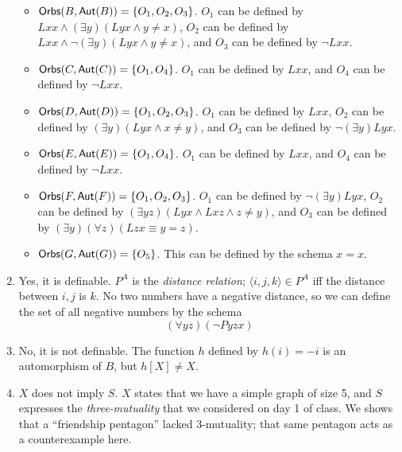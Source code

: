 \begin{mdframed}[linewidth=1]
\begin{enumerate}
\begin{itemize}
        \item $\mbox{$\mathsf{Orbs}(B,\mbox{$\mathsf{Aut}(B)$})$} = \{O_1, O_2, O_3\}$. $O_1$ can be defined by $Lxx \land (\exists y)(Lyx \land y \neq x)$, $O_2$ can be defined by $Lxx \land \lnot (\exists y)(Lyx \land y \neq x)$, and $O_3$ can be defined by $\lnot Lxx$. 

        \item $\mbox{$\mathsf{Orbs}(C,\mbox{$\mathsf{Aut}(C)$})$} = \{O_1, O_4\}$. $O_1$ can be defined by $Lxx$, and $O_4$ can be defined by $\lnot Lxx$. 

        \item $\mbox{$\mathsf{Orbs}(D,\mbox{$\mathsf{Aut}(D)$})$} = \{O_1, O_2, O_3\}$. $O_1$ can be defined by $Lxx$, $O_2$ can be defined by $(\exists y)(Lyx \land x \neq y)$, and $O_3$ can be defined by $\lnot (\exists y)Lyx$. 

        \item $\mbox{$\mathsf{Orbs}(E,\mbox{$\mathsf{Aut}(E)$})$} = \{O_1, O_4\}$. $O_1$ can be defined by $Lxx$, and $O_4$ can be defined by $\lnot Lxx$. 

        \item $\mbox{$\mathsf{Orbs}(F,\mbox{$\mathsf{Aut}(F)$})$} = \{O_1, O_2, O_3\}$. $O_1$ can be defined by $\lnot (\exists y)Lyx$, $O_2$ can be defined by $(\exists yz)(Lyx \land Lxz \land z \neq y)$, and $O_3$ can be defined by $(\exists y)(\forall z)(Lzx \equiv y = z)$. 

        \item $\mbox{$\mathsf{Orbs}(G,\mbox{$\mathsf{Aut}(G)$})$} = \{O_5\}$. This can be defined by the schema $x = x$. 
    \end{itemize}

    \item Yes, it is definable. $P^A$ is the \emph{distance relation}; $\langle i, j, k \rangle \in P^A$ iff the distance between $i, j$ is $k$. No two numbers have a negative distance, so we can define the set of all negative numbers by the schema
    \[
        (\forall yz)(\lnot Pyzx)
    \]

    \item No, it is not definable. The function $h$ defined by $h(i) = -i$ is an automorphism of $B$, but $h[X] \neq X$. 
\iffalse
    \item Yes, $X$ does imply $S$. Here is a derivation
    \[
\begin{array}{lll}
\{1\}   & (1)\ (\exists y)(\forall x)(Lxy \vee Lyx)  & \mathrm{P}\\
\{1, 2\} & (2)\ (\forall x)(Lxy \vee Lyx) & (1)y\ \mathrm{EII}\\
\{1, 2\} & (3)\ (Lxy \vee Lyx) & (2)\ \mathrm{UI}\\
\{1, 2\} & (4)\ (\exists y)(Lxy \vee Lyx) & (3)\ \mathrm{EG}\\
\{1\} & (5)\ (\exists y)(Lxy \vee Lyx) & (4)\{2\}\ \mathrm{EIE}\\
\{1\} & (6)\ (\forall x)(\exists y)(Lxy \vee Lyx) & (5)\ \mathrm{UG}
\end{array}
\]
\fi
    \item $X$ does not imply $S$. $X$ states that we have a simple graph of size 5, and $S$ expresses the \emph{three-mutuality} that we considered on day 1 of class. We shows that a ``friendship pentagon'' lacked 3-mutuality; that same pentagon acts as a counterexample here. 


\end{enumerate}
\end{mdframed}
